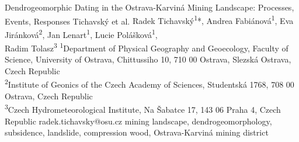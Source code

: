 \abstract
{Dendrogeomorphic Dating in the Ostrava-Karviná Mining Landscape: Processes, Events, Responses} %
{Tichavský et al.} %
{Radek Tichavský\textsuperscript{1}*, Andrea Fabiánová\textsuperscript{1}, Eva Jiránková\textsuperscript{2}, Jan Lenart\textsuperscript{1}, Lucie Polášková\textsuperscript{1}, \\Radim Tolasz\textsuperscript{3}
} %
{\TLtag} %
{
\textsuperscript{1}Department of Physical Geography and Geoecology, Faculty of Science, University of Ostrava, Chittussiho 10, 710 00 Ostrava, Slezská Ostrava, Czech Republic\\
\textsuperscript{2}Institute of Geonics of the Czech Academy of Sciences, Studentská 1768, 708 00 Ostrava, Czech Republic\\
\textsuperscript{3}Czech Hydrometeorological Institute, Na Šabatce 17, 143 06 Praha 4, Czech Republic
} %
{radek.tichavsky@osu.cz}  %
{mining landscape, dendrogeomorphology, subsidence, landslide, compression wood, Ostrava-Karviná mining district}%

